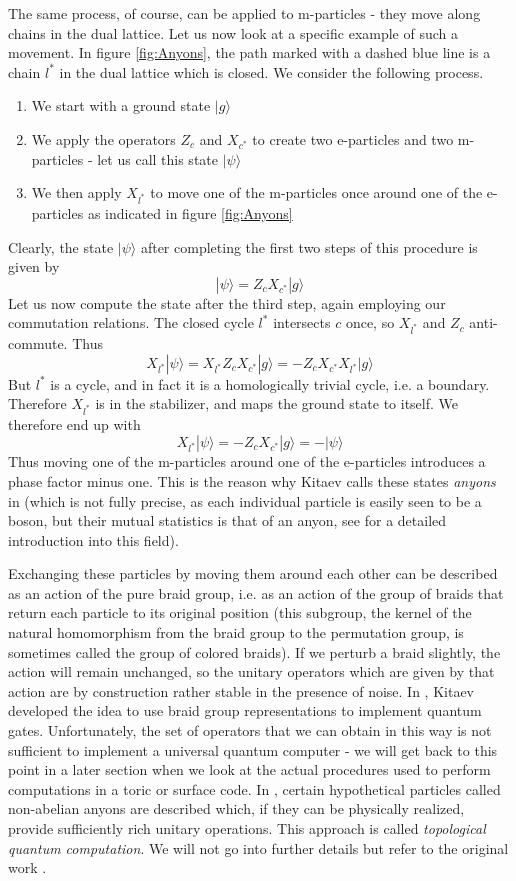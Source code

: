 \documentclass[a4paper, draft]{article}
\theoremstyle{own}
\theoremstyle{remark}
\begin{document}
The same process, of course, can be applied to m-particles - they move along chains in the dual lattice. Let us now look at a specific example of such a movement. In figure \ref{fig:Anyons}, the path marked with a dashed blue line is a chain $l^*$ in the dual lattice which is closed. We consider the following process.
\begin{enumerate}
	\item We start with a ground state $|g \rangle$
	\item We apply the operators $Z_c$ and $X_{c^*}$ to create two e-particles and two m-particles - let us call this state $|\psi \rangle$
	\item We then apply $X_{l^*}$ to move one of the m-particles once around one of the e-particles as indicated in figure \ref{fig:Anyons}
\end{enumerate}
Clearly, the state $|\psi \rangle$ after completing the first two steps of this procedure is given by
$$
|\psi \rangle = Z_c X_{c^*}  |g \rangle
$$
Let us now compute the state after the third step, again employing our commutation relations. The closed cycle $l^*$ intersects $c$ once, so $X_{l^*}$ and $Z_c$ anti-commute. Thus
$$
X_{l^*} |\psi \rangle = X_{l^*}  Z_c X_{c^*} |g \rangle = -   Z_c X_{c^*} X_{l^*} |g \rangle
$$
But $l^*$ is a cycle, and in fact it is a homologically trivial cycle, i.e. a boundary. Therefore $X_{l^*}$ is in the stabilizer, and maps the ground state to itself. We therefore end up with
$$
X_{l^*} |\psi \rangle =  -   Z_c X_{c^*}  |g \rangle = - |\psi \rangle
$$
Thus moving one of the m-particles around one of the e-particles introduces a phase factor minus one. This is the reason why Kitaev calls these states \emph{anyons} in \cite{Kitaev} (which is not fully precise, as each individual particle is easily seen to be a boson, but their mutual statistics is that of an anyon, see \cite{Rao} for a detailed introduction into this field).

Exchanging these particles by moving them around each other can be described as an action of the pure braid group, i.e. as an action of the group of braids that return each particle to its original position (this subgroup, the kernel of the natural homomorphism from the braid group to the permutation group, is sometimes called the group of colored braids). If we perturb a braid slightly, the action will remain unchanged, so the unitary operators which are given by that action are by construction rather stable in the presence of noise. In \cite{Kitaev}, Kitaev developed the idea to use braid group representations to implement quantum gates. Unfortunately, the set of operators that we can obtain in this way is not sufficient to implement a universal quantum computer - we will get back to this point in a later section when we look at the actual procedures used to perform computations in a toric or surface code. In \cite{Kitaev}, certain hypothetical particles called non-abelian anyons are described which, if they can be physically realized, provide sufficiently rich unitary operations. This approach is called \emph{topological quantum computation}. We will not go into further details but refer to the original work \cite{Kitaev}. 
\end{document}
